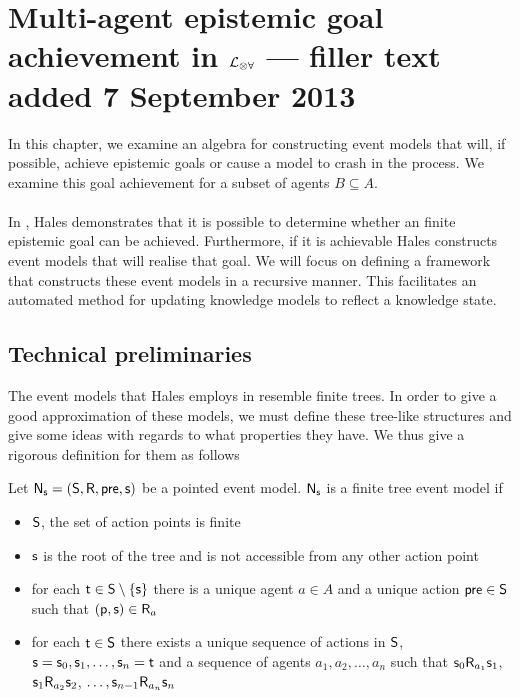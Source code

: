 \section{Multi-agent epistemic goal achievement in $\mathcal{L}_{\otimes\forall}$ --- filler text added 7 September
2013} \label{chapter:Multiagent}

In this chapter, we examine an algebra for constructing event models that will, if possible, achieve
epistemic goals or cause a model to crash in the process.
We examine this goal achievement for a subset of agents $B \subseteq A$.\\
\\
In \cite{hales13synthesis}, Hales demonstrates that it is possible to determine whether an
finite epistemic goal can be achieved.
Furthermore, if it is achievable Hales constructs event models that will realise
that goal.
We will focus on defining a framework that constructs these event models in a
recursive manner.
This facilitates an automated method for updating knowledge models to reflect a
knowledge state.

\subsection{Technical preliminaries}

The event models that Hales employs in \cite{hales13synthesis} resemble finite trees.
In order to give a good approximation of these models, we must define these tree-like structures and
give some ideas with regards to what properties they have.
We thus give a rigorous definition for them as follows

\begin{defn} \label{finTree}
Let $\mathrm{\mathsf{N}}_\mathrm{\mathsf{s}} = (\mathrm{\mathsf{S}}, \mathrm{\mathsf{R}}, \mathrm{\mathsf{pre}}, \mathrm{\mathsf{s}})$ be a pointed event model.
$\mathrm{\mathsf{N}}_\mathrm{\mathsf{s}}$ is a finite tree event model if
\begin{itemize}
	\item $\mathrm{\mathsf{S}}$, the set of action points is finite
	\item $\mathrm{\mathsf{s}}$ is the root of the tree and is not accessible from any other action point
	\item for each $\mathrm{\mathsf{t}} \in \mathrm{\mathsf{S}} \setminus \{ \mathrm{\mathsf{s}} \}$ there is a unique agent $a \in A$ and a unique
	action $\mathrm{\mathsf{pre}} \in \mathrm{\mathsf{S}}$ such that $\mathrm{\mathsf{(p,s)}} \in \mathrm{\mathsf{R}}_a$
	\item for each $\mathrm{\mathsf{t}} \in \mathrm{\mathsf{S}}$ there exists a unique sequence of actions in $\mathrm{\mathsf{S}}$, $\mathrm{\mathsf{s}} = \mathrm{\mathsf{s}}_0,
	\mathrm{\mathsf{s}}_1, \ldots, \mathrm{\mathsf{s}}_n = \mathrm{\mathsf{t}}$ and a sequence of agents $a_1, a_2, \ldots, a_n$ such that $\mathrm{\mathsf{s}}_0
	\mathrm{\mathsf{R}}_{a_1}
	\mathrm{\mathsf{s}}_1$, $\mathrm{\mathsf{s}}_1 \mathrm{\mathsf{R}}_{a_2} \mathrm{\mathsf{s}}_2$, $\ldots, \mathrm{\mathsf{s}}_{n-1} \mathrm{\mathsf{R}}_{a_n} \mathrm{\mathsf{s}}_n$
\end{itemize}
\end{defn}


